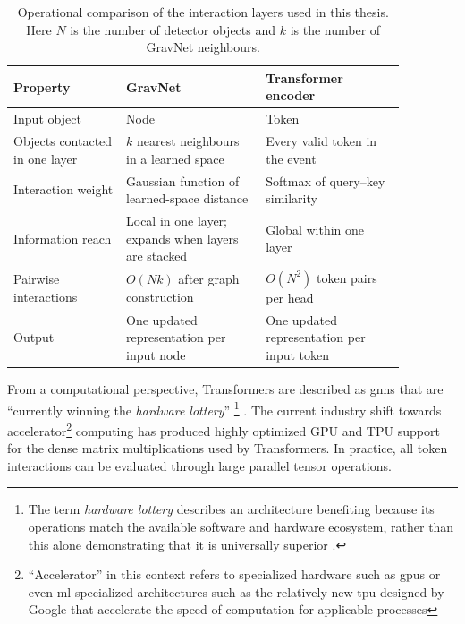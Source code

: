 \begin{table}[htbp]
    \centering
    \small
    \caption{Operational comparison of the interaction layers used in this
    thesis. Here \(N\) is the number of detector objects and \(k\) is the
    number of GravNet neighbours.}
    \label{tab:gravnet_transformer_comparison}
    \begin{tabular}{p{0.25\linewidth} p{0.31\linewidth} p{0.31\linewidth}}
        \hline
        Property & GravNet & Transformer encoder \\
        \hline
        Input object & Node & Token \\
        Objects contacted in one layer &
        \(k\) nearest neighbours in a learned space &
        Every valid token in the event \\
        Interaction weight &
        Gaussian function of learned-space distance &
        Softmax of query--key similarity \\
        Information reach &
        Local in one layer; expands when layers are stacked &
        Global within one layer \\
        Pairwise interactions &
        \(O(Nk)\) after graph construction &
        \(O(N^2)\) token pairs per head \\
        Output &
        One updated representation per input node &
        One updated representation per input token \\
        \hline
    \end{tabular}
\end{table}

From a computational perspective, Transformers are described as \gls{gnn}s that are
``currently winning the \textit{hardware lottery}'' \footnote{The term \emph{hardware lottery} describes an architecture benefiting because
its operations match the available software and hardware ecosystem, rather
than this alone demonstrating that it is universally superior
\cite{hooker2020hardwarelottery}.} \cite{joshi2025transformersgnn}. The current industry shift towards
accelerator\footnote{``Accelerator'' in this context refers to specialized hardware such as \glspl{gpu} or even \gls{ml} specialized architectures such as the relatively new \gls{tpu} designed by Google that accelerate the speed of computation for applicable processes\cite{needed}} computing has produced highly optimized GPU and TPU support for
the dense matrix multiplications used by Transformers. In practice, all
token interactions can be evaluated through large parallel tensor operations.

